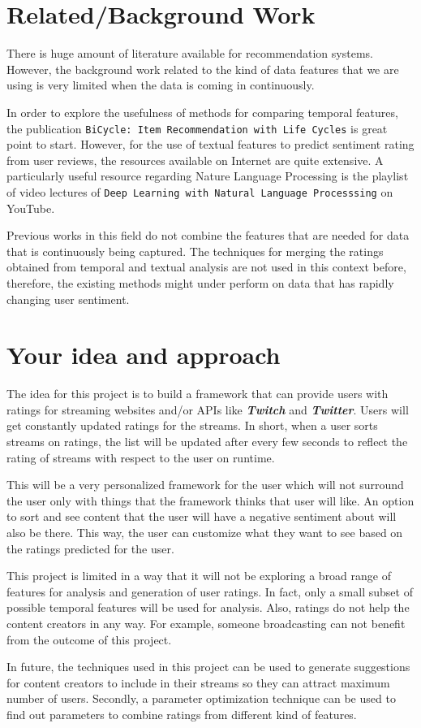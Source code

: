 \documentclass[11pt]{article}
\begin{document}
\section{Related/Background Work}
\par
There is huge amount of literature available for recommendation systems. However, the background work related to the kind of data features that we are using is very limited when the data is coming in continuously.
\par
In order to explore the usefulness of methods for comparing temporal features, the publication {\tt BiCycle: Item Recommendation with Life Cycles} is great point to start. However, for the use of textual features to predict sentiment rating from user reviews, the resources available on Internet are quite extensive. A particularly useful resource regarding Nature Language Processing is the playlist of video lectures of {\tt Deep Learning with Natural Language Processsing} on YouTube.
\par
Previous works in this field do not combine the features that are needed for data that is continuously being captured. The techniques for merging the ratings obtained from temporal and textual analysis are not used in this context before, therefore, the existing methods might under perform on data that has rapidly changing user sentiment.

\section{Your idea and approach}
\par
The idea for this project is to build a framework that can provide users with ratings for streaming websites and/or APIs like \textbf{\textit{Twitch}} and \textbf{\textit{Twitter}}. Users will get constantly updated ratings for the streams. In short, when a user sorts streams on ratings, the list will be updated after every few seconds to reflect the rating of streams with respect to the user on runtime.
\par
This will be a very personalized framework for the user which will not surround the user only with things that the framework thinks that user will like. An option to sort and see content that the user will have a negative sentiment about will also be there. This way, the user can customize what they want to see based on the ratings predicted for the user.
\par
This project is limited in a way that it will not be exploring a broad range of features for analysis and generation of user ratings. In fact, only a small subset of possible temporal features will be used for analysis. Also, ratings do not help the content creators in any way. For example, someone broadcasting can not benefit from the outcome of this project.
\par
In future, the techniques used in this project can be used to generate suggestions for content creators to include in their streams so they can attract maximum number of users. Secondly, a parameter optimization technique can be used to find out parameters to combine ratings from different kind of features.
\end{document}
